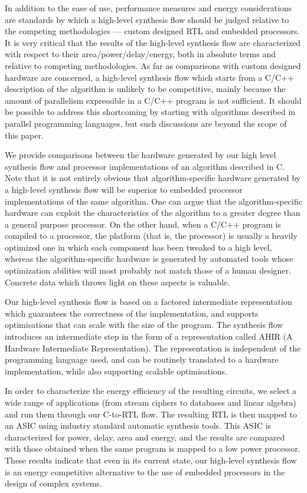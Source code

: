 \documentclass[conference]{IEEEtran}
\begin{document}
In addition to the ease of use, performance measures and energy
considerations are standards by which a high-level synthesis flow
should be judged relative to the competing methodologies --- custom
designed RTL and embedded processors.  It is very critical
that the results of the high-level synthesis flow are characterized
with respect to their area/power/delay/energy, both in absolute terms
and relative to competing methodologies.  As far as comparisons
with  custom designed hardware are concerned, a high-level synthesis flow
which starts from a C/C++ description of the algorithm is unlikely to
be competitive, mainly because the amount of parallelism expressible in 
a C/C++ program is not sufficient.   It should be possible to address
this shortcoming by starting with algorithms described in parallel
programming languages, but such discussions are beyond the scope of
this paper.   

We provide comparisons between
the hardware generated by our high level synthesis flow and  
processor implementations of an algorithm described in C.  
Note that it is not entirely obvious that algorithm-specific hardware 
generated by a high-level synthesis flow will be superior
to embedded processor implementations of the same algorithm.  
One can argue that the algorithm-specific hardware
can exploit the characteristics of the algorithm to a greater
degree than a general purpose processor.  
On the other hand, when a C/C++ program is compiled to
a processor, the platform (that is, the processor) is usually a
heavily optimized one in which each component has been tweaked to a
high level, whereas the algorithm-specific
hardware is generated by automated tools whose optimization abilities
will most probably not match those of a human designer.   
Concrete data which throws light on these aspects is valuable.

Our high-level synthesis flow is based on a factored intermediate
representation which guarantees the correctness of the implementation,
and supports optimisations that can scale with the size of the
program. The synthesis flow introduces an intermediate step in the
form of a representation called AHIR (A Hardware Intermediate
Representation). The representation is independent of the programming
language used, and can be routinely translated to a hardware
implementation, while also supporting scalable
optimisations\cite{AHIR_sameerds_hakim_2007}\cite{ahir_thesis}.

In order to characterize the energy efficiency of the resulting
circuits, we select a wide range of applications (from stream ciphers
to databases and linear algebra) and run them through our C-to-RTL
flow. The resulting RTL is then mapped to an ASIC using industry
standard automatic synthesis tools. This ASIC is characterized for
power, delay, area and energy, and the results are compared with those
obtained when the same program is mapped to a low power processor.
These results indicate that even in its current state, our high-level
synthesis flow is an energy competitive alternative to the use of
embedded processors in the design of complex systems.
\end{document}
